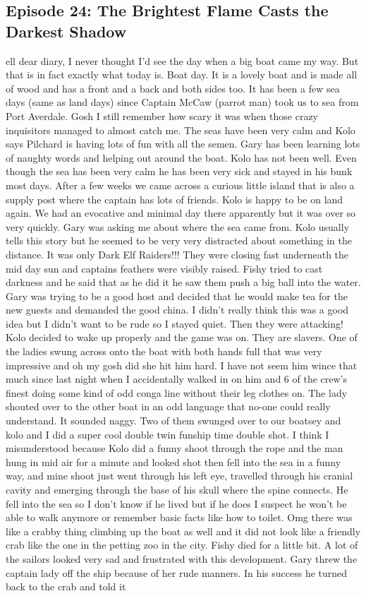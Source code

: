 \subsection{Episode 24: The Brightest Flame Casts the Darkest Shadow}
ell dear diary, I never thought I’d see the day when a big boat came my way. But that is in fact exactly what today is. Boat day. It is a lovely boat and is made all of wood and has a front and a back and both sides too. It has been a few sea days (same as land days) since Captain McCaw (parrot man) took us to sea from Port Averdale. Gosh I still remember how scary it was when those crazy inquisitors managed to almost catch me. The seas have been very calm and Kolo says Pilchard is having lots of fun with all the semen. Gary has been learning lots of naughty words and helping out around the boat. Kolo has not been well. Even though the sea has been very calm he has been very sick and stayed in his bunk most days. After a few weeks we came across a curious little island that is also a supply post where the captain has lots of friends. Kolo is happy to be on land again. We had an evocative and minimal day there apparently but it was over so very quickly. Gary was asking me about where the sea came from. Kolo usually tells this story but he seemed to be very very distracted about something in the distance. It was only Dark Elf Raiders!!! They were closing fast underneath the mid day sun and captains feathers were visibly raised. Fishy tried to cast darkness and he said that as he did it he saw them push a big ball into the water. Gary was trying to be a good host and decided that he would make tea for the new guests and demanded the good china. I didn’t really think this was a good idea but I didn’t want to be rude so I stayed quiet. Then they were attacking! Kolo decided to wake up properly and the game was on. They are slavers. One of the ladies swung across onto the boat with both hands full that was very impressive and oh my gosh did she hit him hard. I have not seem him wince that much since last night when I accidentally walked in on him and 6 of the crew’s finest doing some kind of odd conga line without their leg clothes on. The lady shouted over to the other boat in an odd language that no-one could really understand. It sounded naggy. Two of them swunged over to our boatsey and kolo and I did a super cool double twin funship time double shot. I think I misunderstood because Kolo did a funny shoot through the rope and the man hung in mid air for a minute and looked shot then fell into the sea in a funny way, and mine shoot just went through his left eye, travelled through his cranial cavity and emerging through the base of his skull where the spine connects. He fell into the sea so I don’t know if he lived but if he does I suspect he won’t be able to walk anymore or remember basic facts like how to toilet. Omg there was like a crabby thing climbing up the boat as well and it did not look like a friendly crab like the one in the petting zoo in the city. Fishy died for a little bit. A lot of the sailors looked very sad and frustrated with this development. Gary threw the captain lady off the ship because of her rude manners. In his success he turned back to the crab and told it 